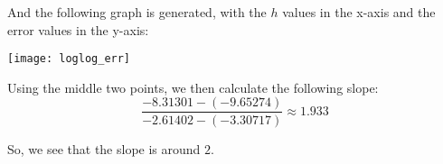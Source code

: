 \documentclass{article}
\begin{document}
\begin{solution}
And the following graph is generated, with the $h$ values in the x-axis and the error values in the y-axis:
\begin{center}
	\texttt{[image: loglog\_err]}
\end{center}

Using the middle two points, we then calculate the following slope:
\begin{equation*}
	\frac{-8.31301 - (-9.65274)}{-2.61402 - (-3.30717)} \approx 1.933
\end{equation*}

So, we see that the slope is around $2$.
\end{solution}
\end{document}
